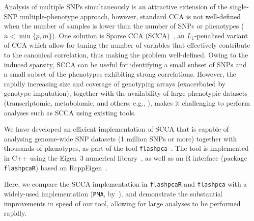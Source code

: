 \documentclass{bioinfo}
\begin{document}
Analysis of multiple SNPs simultaneously is an attractive extension
of the single-SNP multiple-phenotype approach, however, standard CCA
is not well-defined when the number of samples is lower than the
number of SNPs or phenotypes ($n<\min\{p, m\}$).  One solution is
Sparse CCA (SCCA)~\citep{Witten2009c,Witten2009b,Parkhomenko2009},
an $L_1$-penalised variant of CCA which allow for tuning the number of
variables that effectively contribute to the canonical correlation, thus
making the problem well-defined. Owing to the induced sparsity, SCCA can
be useful for identifying a small subset of SNPs and a small subset of the
phenotypes exhibiting strong correlations.  However, the rapidly increasing
size and coverage of genotyping arrays (exacerbated by genotype imputation),
together with the availability of large phenotypic datasets (transcriptomic,
metabolomic, and others; e.g., \citet{Bartel2015,TheGTExConsortium2015}),
makes it challenging to perform analyses such as SCCA using existing tools.

We have developed an efficient implementation of SCCA that is
capable of analysing genome-wide SNP datasets (1 million SNPs
or more) together with thousands of phenotypes, as part of the tool
\texttt{flashpca}~\citep{Abraham2014}. The tool is implemented in \textsf{C++}
using the Eigen~3 numerical library~\citep{eigenweb}, as well as an \textsf{R}
interface (package \texttt{flashpcaR}) based on RcppEigen~\citep{Bates2013}.

Here, we compare the SCCA implementation in \texttt{flashpcaR} and
\texttt{flashpca} with a widely-used implementation (\texttt{PMA},
by~\citet{Witten2013}), and demonstrate the substantial improvements in
speed of our tool, allowing for large analyses to be performed rapidly.
\end{document}
